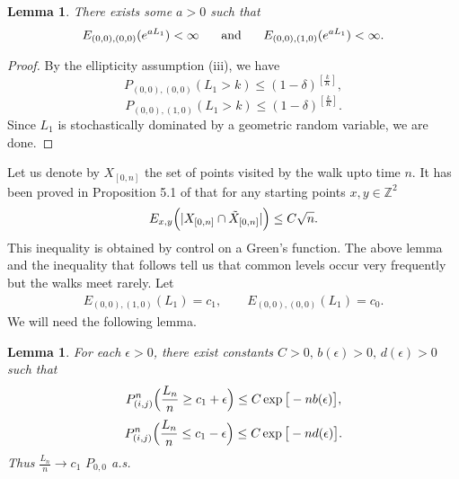 \documentclass[11pt]{amsart}
\newtheorem{lemma}[theorem]{\sc Lemma}
\begin{document}
\bigskip

\begin{lemma}
\label{expL}
There exists some $a>0$ such that 
\[ E_{(0,0),(0,0)}(e^{aL_1}) < \infty \hspace{0.5cm} \mbox{ and } \hspace{0.5cm}
  E_{(0,0),(1,0)}(e^{aL_1}) < \infty.
\]

\end{lemma}
\begin{proof} 
By the ellipticity assumption (iii), we have
\[ P_{(0,0),(0,0)}(L_1 > k ) \le (1-\delta)^{[\frac{k}{K} ]}, \]
\[P_{(0,0),(1,0)} (L_1 > k ) \le (1-\delta)^{[ \frac{k}{K} ]}. \]
Since $L_1$ is stochastically dominated by a geometric random variable, we are done. 
\end{proof}
\vspace{0.3cm}

Let us denote by $X_{[0,n]}$ the set of points visited by the walk upto time $n$. It has been proved in Proposition 5.1 of \cite{rsqi} that for any starting points $x,y \in \mathbb{Z}^2$
\begin{eqnarray}
\label{intup}
 E_{x,y} \Big{(} \vert X_{[0,n]} \cap \tilde{X}_{[0,n]} \vert \Big{)} \leq C\sqrt{n}. 
 \end{eqnarray}
This inequality is obtained by control on a Green's function. The above lemma and the inequality that follows tell us that common levels occur very frequently but the walks meet rarely. Let
\begin{eqnarray}
\label{c1}
 E_{(0,0),(1,0)}(L_1) = c_1 , \qquad E_{(0,0),(0,0)}(L_1)=c_0 .
 \end{eqnarray}
We will need the following lemma.

\bigskip

\begin{lemma}
\label{LDP}
For each $\epsilon >0$, there exist constants $C>0 \mbox{, }b(\epsilon)>0\mbox{, } d(\epsilon)>0$
such that 
\[ P_{(i,j)}^n\Big{(}\frac{L_n}{n} \ge c_1+ \epsilon \Big{)} \le C\exp\big{[}-nb(\epsilon) \big{]}, \]
\[P_{(i,j)}^n\Big{(}\frac{L_n}{n} \le c_1- \epsilon \Big{)} \le C\exp\big{[}-nd(\epsilon) \big{]} .\]
Thus $\frac{L_n}{n} \rightarrow c_1 \,\, P_{0,0}$ a.s.
\end{lemma}
\end{document}
